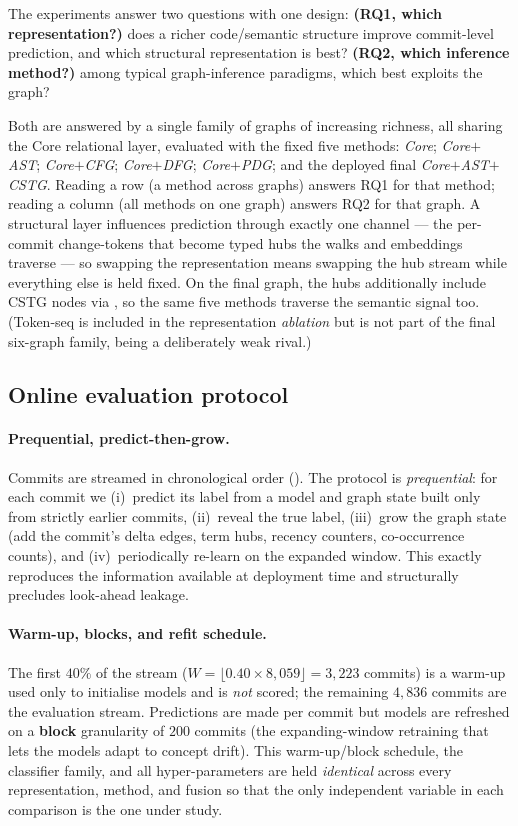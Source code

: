 	The experiments answer two questions with one design:
	\textbf{(RQ1, which representation?)} does a richer code/semantic structure improve
	commit-level prediction, and which structural representation is best?
	\textbf{(RQ2, which inference method?)} among typical graph-inference paradigms, which
	best exploits the graph?
	
	Both are answered by a single family of graphs of increasing richness, all sharing the
	Core relational layer, evaluated with the fixed five methods:
	\emph{Core}; \emph{Core$+$AST}; \emph{Core$+$CFG}; \emph{Core$+$DFG};
	\emph{Core$+$PDG}; and the deployed final \emph{Core$+$AST$+$CSTG}. Reading a row
	(a method across graphs) answers RQ1 for that method; reading a column (all methods on
	one graph) answers RQ2 for that graph. A structural layer influences prediction through
	exactly one channel --- the per-commit change-tokens  that
	become typed hubs the walks and embeddings traverse --- so swapping the representation
	means swapping the hub stream while everything else is held fixed. On the final graph,
	the hubs additionally include CSTG  nodes via , so the same
	five methods traverse the semantic signal too. (Token-seq is included in the
	representation \emph{ablation} but is not part of the final six-graph family, being a
	deliberately weak rival.)
	
	\subsection{Online evaluation protocol}
	\label{sec:setup-protocol}
	
	\paragraph{Prequential, predict-then-grow.} Commits are streamed in chronological
	order (). The protocol is \emph{prequential}: for each commit we
	(i)~predict its label from a model and graph state built only from strictly earlier
	commits, (ii)~reveal the true label, (iii)~grow the graph state (add the commit's
	delta edges, term hubs, recency counters, co-occurrence counts), and (iv)~periodically
	re-learn on the expanded window. This exactly reproduces the information available at
	deployment time and structurally precludes look-ahead leakage.
	
	\paragraph{Warm-up, blocks, and refit schedule.} The first \textbf{$40\%$} of the
	stream ($W = \lfloor 0.40\times 8{,}059\rfloor = 3{,}223$ commits) is a warm-up used
	only to initialise models and is \emph{not} scored; the remaining $4{,}836$ commits are
	the evaluation stream. Predictions are made per commit but models are refreshed on a
	\textbf{block} granularity of $200$ commits (the expanding-window retraining that lets
	the models adapt to concept drift). This warm-up/block schedule, the classifier family,
	and all hyper-parameters are held \emph{identical} across every representation, method,
	and fusion so that the only independent variable in each comparison is the one under
	study.
	
